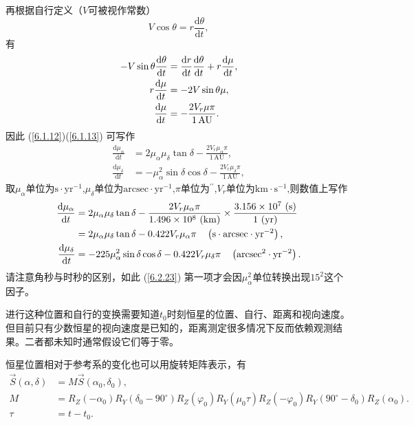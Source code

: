\documentclass[11pt, a4paper, oneside]{ctexart}
\numberwithin{equation}{subsection}
\begin{document}
再根据自行定义（$V$可被视作常数）
\begin{equation}
V\cos\theta=r\frac{\mathrm{d}\theta}{\mathrm{d}t},
\end{equation}
有
\begin{align}
-V\sin\theta\frac{\mathrm{d}\theta}{\mathrm{d}t}&=\frac{\mathrm{d}r}{\mathrm{d}t}\frac{\mathrm{d}\theta}{\mathrm{d}t}+r\frac{\mathrm{d}\mu}{\mathrm{d}t},\notag\\
r\frac{\mathrm{d}\mu}{\mathrm{d}t}&=-2V\sin\theta\mu,\notag\\
\frac{\mathrm{d}\mu}{\mathrm{d}t}&=-\frac{2V_r\mu\pi}{1\,\mathrm{AU}}.
\end{align}
因此 (\ref{6.1.12})(\ref{6.1.13}) 可写作
\begin{align}
\frac{\mathrm{d}\mu_\alpha}{\mathrm{d}t}&=2\mu_\alpha\mu_\delta\tan\delta-\frac{2V_r\mu_\alpha\pi}{1\,\mathrm{AU}},\\
\frac{\mathrm{d}\mu_\delta}{\mathrm{d}t}&=-\mu_\alpha^2\sin\delta\cos\delta-\frac{2V_r\mu_\delta\pi}{1\,\mathrm{AU}},
\end{align}
取$\mu_\alpha$单位为$\mathrm{s\cdot yr^{-1}}$,$\mu_\delta$单位为$\mathrm{arcsec\cdot yr^{-1}}$,$\pi$单位为$^{\prime\prime}$,$V_r$单位为$\mathrm{km\cdot{}s^{-1}}$,则数值上写作
\begin{align}
\frac{\mathrm{d}\mu_\alpha}{\mathrm{d}t}&=2\mu_\alpha\mu_\delta\tan\delta-\frac{2V_r\mu_\alpha\pi}{\rm 1.496\times10^8\,\left(\mathrm{km}\right)}\times\frac{3.156\times10^7\,\left(\mathrm{s}\right)}{1\,\left(\mathrm{yr}\right)}\\
&=2\mu_\alpha\mu_\delta\tan\delta-0.422V_r\mu_\alpha\pi\quad\left(\mathrm{s\cdot arcsec\cdot yr^{-2}}\right),\\
\frac{\mathrm{d}\mu_\delta}{\mathrm{d}t}&=-225\mu_\alpha^2\sin\delta\cos\delta-0.422V_r\mu_\delta\pi\quad\left(\mathrm{arcsec^{2}\cdot yr^{-2}}\right).\label{6.2.23}
\end{align}
请注意角秒与时秒的区别，如此 (\ref{6.2.23}) 第一项才会因$\mu_{\alpha}^{2}$单位转换出现$15^{2}$这个因子。

进行这种位置和自行的变换需要知道$t_0$时刻恒星的位置、自行、距离和视向速度。但目前只有少数恒星的视向速度是已知的，距离测定很多情况下反而依赖观测结果。二者都未知时通常假设它们等于零。

恒星位置相对于参考系的变化也可以用旋转矩阵表示，有
\begin{align}
\vec S\left(\alpha,\delta\right)&=M\vec S\left(\alpha_0,\delta_0\right),\\
M&=R_Z\left(-\alpha_0\right)R_Y\left(\delta_0-90^\circ\right)R_Z\left(\varphi_0\right)R_Y\left(\mu_0\tau\right)R_Z\left(-\varphi_0\right)R_Y\left(90^\circ-\delta_0\right)R_Z\left(\alpha_0\right).\\
\tau&=t-t_{0}.
\end{align}
\end{document}
